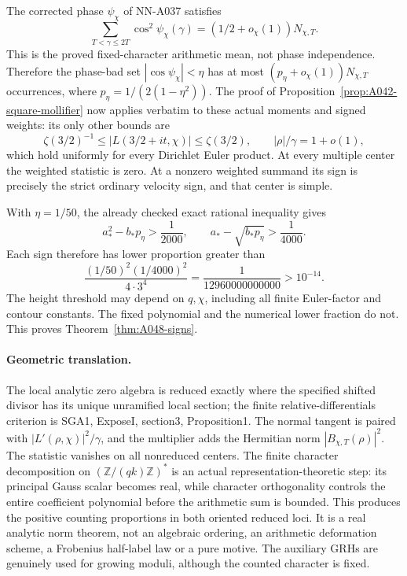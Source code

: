 The corrected phase \(\psi_\chi\) of NN-A037 satisfies
\[
 \sum_{T<\gamma\le2T}\cos^2\psi_\chi(\gamma)
                     =(1/2+o_\chi(1))N_{\chi,T}.
\]
This is the proved fixed-character arithmetic mean,
not phase independence. Therefore the phase-bad set
\(|\cos\psi_\chi|<\eta\) has at most
\((p_\eta+o_\chi(1))N_{\chi,T}\) occurrences, where
\(p_\eta=1/(2(1-\eta^2))\).
The proof of Proposition~\ref{prop:A042-square-mollifier}
now applies verbatim to these actual moments and
signed weights: its only other bounds are
\[
 \zeta(3/2)^{-1}\le |L(3/2+it,\chi)|\le\zeta(3/2),
       \qquad |\rho|/\gamma=1+o(1),
\]
which hold uniformly for every Dirichlet Euler product.
At every multiple center the weighted statistic is zero.
At a nonzero weighted summand its sign is precisely the
strict ordinary velocity sign, and that center is simple.

With \(\eta=1/50\), the already checked exact rational
inequality gives
\[
 a_*^2-b_*p_\eta>\frac1{2000},\qquad
 a_*-\sqrt{b_*p_\eta}>\frac1{4000}.
\]
Each sign therefore has lower proportion greater than
\[
 \frac{(1/50)^2(1/4000)^2}{4\cdot3^4}
            =\frac1{12960000000000}>10^{-14}.
\]
The height threshold may depend on \(q,\chi\), including
all finite Euler-factor and contour constants. The
fixed polynomial and the numerical lower fraction do
not. This proves Theorem~\ref{thm:A048-signs}.

\paragraph{Geometric translation.}
The local analytic zero algebra is reduced exactly
where the specified shifted divisor has its unique
unramified local section; the finite relative-differentials
criterion is SGA1, ExposeI, section3, Proposition1.
The normal tangent is paired with
\(|L'(\rho,\chi)|^2/\gamma\), and the multiplier adds
the Hermitian norm \(|B_{\chi,T}(\rho)|^2\).
The statistic vanishes on all nonreduced centers.
The finite character decomposition on
\((\mathbb Z/(qk)\mathbb Z)^*\) is an actual
representation-theoretic step: its principal Gauss
scalar becomes real, while character orthogonality
controls the entire coefficient polynomial before
the arithmetic sum is bounded. This produces the
positive counting proportions in both oriented
reduced loci. It is a real analytic norm theorem,
not an algebraic ordering, an arithmetic deformation
scheme, a Frobenius half-label law or a pure motive.
The auxiliary GRHs are genuinely used for growing
moduli, although the counted character is fixed.

